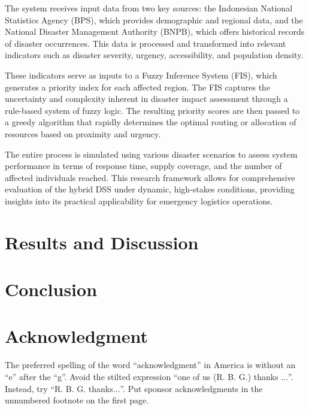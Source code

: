 \documentclass[journal,final,a4paper,twoside,11pt]{IEEEtran}
\begin{document}
The system receives input data from two key sources: the Indonesian National Statistics Agency (BPS), which provides demographic and regional data, and the National Disaster Management Authority (BNPB), which offers historical records of disaster occurrences. This data is processed and transformed into relevant indicators such as disaster severity, urgency, accessibility, and population density.

These indicators serve as inputs to a Fuzzy Inference System (FIS), which generates a priority index for each affected region. The FIS captures the uncertainty and complexity inherent in disaster impact assessment through a rule-based system of fuzzy logic. The resulting priority scores are then passed to a greedy algorithm that rapidly determines the optimal routing or allocation of resources based on proximity and urgency.

The entire process is simulated using various disaster scenarios to assess system performance in terms of response time, supply coverage, and the number of affected individuals reached. This research framework allows for comprehensive evaluation of the hybrid DSS under dynamic, high-stakes conditions, providing insights into its practical applicability for emergency logistics operations.

\section{Results and Discussion}

\section{Conclusion}


\section*{Acknowledgment}

The preferred spelling of the word ``acknowledgment'' in America is without 
an ``e'' after the ``g''. Avoid the stilted expression ``one of us (R. B. 
G.) thanks $\ldots$''. Instead, try ``R. B. G. thanks$\ldots$''. Put sponsor 
acknowledgments in the unnumbered footnote on the first page.




 




\label{lastPage}
\end{document}

